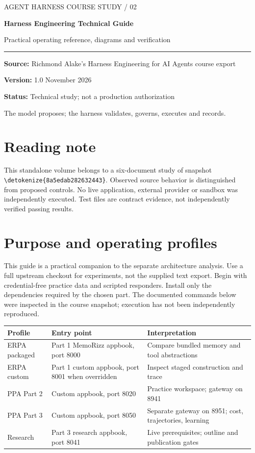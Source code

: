 \documentclass[11pt,letterpaper]{article}
\newcommand{\src}[1]{\expandafter\nolinkurl\expandafter{\detokenize{#1}}}
\begin{document}
\begin{titlepage}
\vspace*{1.25in}
{\color{teal}\large AGENT HARNESS COURSE STUDY / 02\par}\vspace{.3in}
{\color{navy}\Huge\bfseries Harness Engineering Technical Guide\par}\vspace{.18in}
{\Large Practical operating reference, diagrams and verification\par}\vspace{.5in}
\rule{\linewidth}{1pt}\par
\textbf{Source:} Richmond Alake's Harness Engineering for AI Agents course export\par
\textbf{Version:} 1.0  November 2026\par
\textbf{Status:} Technical study; not a production authorization\par
\vfill
The model proposes; the harness validates, governs, executes and records.
\end{titlepage}
\tableofcontents\clearpage
\section*{Reading note}
This standalone volume belongs to a six-document study of snapshot \src{8a5edab282632443}. Observed source behavior is distinguished from proposed controls. No live application, external provider or sandbox was independently executed. Test files are contract evidence, not independently verified passing results.

\section{Purpose and operating profiles}
This guide is a practical companion to the separate architecture analysis. Use a full upstream checkout for experiments, not the supplied text export. Begin with credential-free practice data and scripted responders. Install only the dependencies required by the chosen part. The documented commands below were inspected in the course snapshot; execution has not been independently reproduced.
\begin{tabularx}{\linewidth}{p{.22\linewidth}YY}\toprule
Profile & Entry point & Interpretation \\\midrule
ERPA packaged & Part 1 MemoRizz appbook, port 8000 & Compare bundled memory and tool abstractions \\
ERPA custom & Part 1 custom appbook, port 8001 when overridden & Inspect staged construction and trace \\
PPA Part 2 & Custom appbook, port 8020 & Practice workspace; gateway on 8941 \\
PPA Part 3 & Custom appbook, port 8050 & Separate gateway on 8951; cost, trajectories, learning \\
Research & Part 3 research appbook, port 8041 & Live prerequisites; outline and publication gates \\
\bottomrule\end{tabularx}
\end{document}
